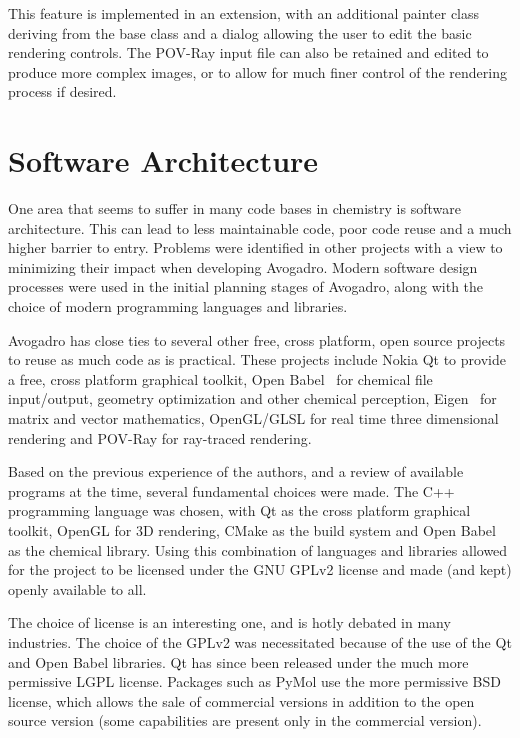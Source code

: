 \documentclass[10pt]{bmc_article}
\newenvironment{bmcformat}{\begin{raggedright}
\baselineskip20pt\sloppy\setboolean{publ}{false}}{\end{raggedright}
\baselineskip20pt\sloppy}
\begin{document}
\begin{bmcformat}
This feature is implemented in an extension, with an additional painter class
deriving from the base class and a dialog allowing the user to edit the basic
rendering controls. The POV-Ray input file can also be retained and edited to
produce more complex images, or to allow for much finer control of the
rendering process if desired.

\section{Software Architecture}

One area that seems to suffer in many code bases in chemistry is software
architecture. This can lead to less maintainable code, poor code reuse and a
much higher barrier to entry. Problems were identified in other projects with a
view to minimizing their impact when developing Avogadro. Modern software design
processes were used in the initial planning stages of Avogadro, along with the
choice of modern programming languages and libraries.


Avogadro has close ties to several other free, cross platform, open source
projects to reuse as much code as is practical. These projects include
Nokia Qt to provide a free, cross platform graphical toolkit, Open
Babel~\cite{OpenBabel} for chemical file input/output, geometry optimization and
other chemical perception, Eigen~\cite{Eigen} for matrix and vector mathematics,
OpenGL/GLSL for real time three dimensional rendering and POV-Ray for ray-traced
rendering.

Based on the previous experience of the authors, and a review of available
programs at the time, several fundamental choices were made. The C++ programming
language was chosen, with Qt as the cross platform graphical toolkit, OpenGL for
3D rendering, CMake as the build system and Open Babel as the chemical library.
Using this combination of languages and libraries allowed for the project to be
licensed under the GNU GPLv2 license and made (and kept) openly available to
all.

The choice of license is an interesting one, and is hotly debated in many
industries. The choice of the GPLv2 was necessitated because of the use of the
Qt and Open Babel libraries. Qt has since been released under the much more
permissive LGPL license. Packages such as PyMol use the more permissive BSD
license, which allows the sale of commercial versions in addition to the open
source version (some capabilities are present only in the commercial version).


\end{bmcformat}
\end{document}

